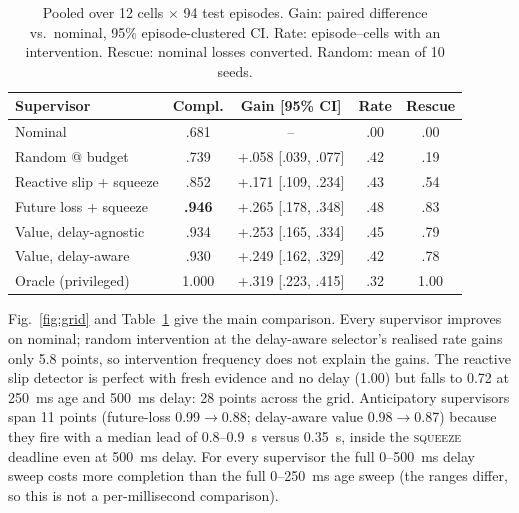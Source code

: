 \documentclass[conference]{IEEEtran}
\newcommand{\remedy}[1]{\textsc{#1}}
\begin{document}
\begin{table}[t]
\caption{Pooled over 12 cells $\times$ 94 test episodes. Gain: paired difference vs.\ nominal, 95\% episode-clustered CI. Rate: episode--cells with an intervention. Rescue: nominal losses converted. Random: mean of 10 seeds.}
\label{tab:main}
\centering
\footnotesize
\setlength{\tabcolsep}{3.5pt}
\begin{tabular}{@{}lcccc@{}}
\toprule
Supervisor & Compl. & Gain [95\% CI] & Rate & Rescue \\
\midrule
Nominal & .681 & -- & .00 & .00 \\
Random @ budget & .739 & +.058 [.039, .077] & .42 & .19 \\
Reactive slip + squeeze & .852 & +.171 [.109, .234] & .43 & .54 \\
Future loss + squeeze & \textbf{.946} & +.265 [.178, .348] & .48 & .83 \\
Value, delay-agnostic & .934 & +.253 [.165, .334] & .45 & .79 \\
Value, delay-aware & .930 & +.249 [.162, .329] & .42 & .78 \\
Oracle (privileged) & 1.000 & +.319 [.223, .415] & .32 & 1.00 \\
\bottomrule
\end{tabular}
\end{table}

Fig.~\ref{fig:grid} and Table~\ref{tab:main} give the main comparison. Every supervisor improves on nominal; random intervention at the delay-aware selector's realised rate gains only 5.8 points, so intervention frequency does not explain the gains. The reactive slip detector is perfect with fresh evidence and no delay (1.00) but falls to 0.72 at 250~ms age and 500~ms delay: 28 points across the grid. Anticipatory supervisors span 11 points (future-loss 0.99$\to$0.88; delay-aware value 0.98$\to$0.87) because they fire with a median lead of 0.8--0.9~s versus 0.35~s, inside the \remedy{squeeze} deadline even at 500~ms delay. For every supervisor the full 0--500~ms delay sweep costs more completion than the full 0--250~ms age sweep (the ranges differ, so this is not a per-millisecond comparison).
\end{document}
